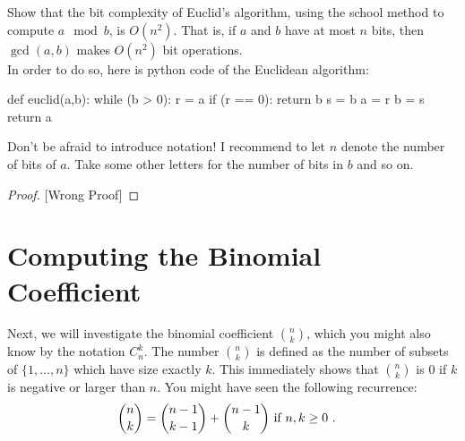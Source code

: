 \documentclass[11pt,a4paper,oneside]{article}
\begin{document}
\begin{problem}{2}
\statement
Show that the bit complexity of Euclid's algorithm, using the school method
to compute $a \mod b$, is $O(n^2)$. That is,
if $a$ and $b$ have at most $n$ bits, then $\gcd(a,b)$ makes $O(n^2)$ bit operations.\\

In order to do so, here is python code of the Euclidean algorithm:
\begin{python}
def euclid(a,b):
	while (b > 0):
		r = a %
		if (r == 0):
			return b
		s = b %
		a = r
		b = s
  	return a
\end{python}
Don't be afraid to introduce notation! I recommend to let $n$ denote the number of bits of $a$.
Take some other letters for the number of bits in $b$ and so on.
\solution
\begin{proof}

[Wrong Proof]

\end{proof}
\end{problem}

\section*{Computing the Binomial Coefficient}

    Next, we will investigate the binomial coefficient ${n \choose k}$, which 
    you might also know by the notation $C^k_n$. The number ${n \choose k}$ is defined
    as the number of subsets of $\{1,\dots,n\}$ which have size exactly $k$. 
    This immediately shows that ${n \choose k}$ is $0$ if $k$ is negative or larger than $n$.
    You might have seen the following recurrence:
    \begin{align*}
     {n \choose k} & = {n-1 \choose k-1} + {n-1 \choose k} \textnormal{ if } n,k \geq 0 \ .
    \end{align*}
\end{document}
